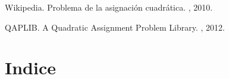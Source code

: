 \documentclass{ci5652}
\begin{document}

\small


\begin{thebibliography}{99}

Wikipedia.
\newblock Problema de la asignación cuadrática.
,  2010.

QAPLIB.
\newblock A Quadratic Assignment Problem Library.
,  2012.

\end{thebibliography}


\newpage
\section*{Indice}
\tableofcontents

\end{document}
